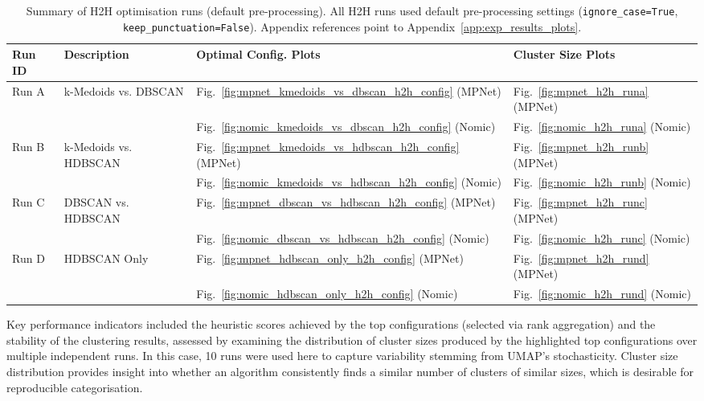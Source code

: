 \documentclass[10pt,oneside]{report}
\begin{document}
\begin{table}[H] 
    \centering
    \begin{adjustbox}{max width=\textwidth}
    \begin{tabular}{l l l l}
        \toprule
        \textbf{Run ID} & \textbf{Description} & \textbf{Optimal Config. Plots} & \textbf{Cluster Size Plots} \\
        \midrule
        Run A & k-Medoids vs. DBSCAN & Fig.~\ref{fig:mpnet_kmedoids_vs_dbscan_h2h_config} (MPNet) & Fig.~\ref{fig:mpnet_h2h_runa} (MPNet) \\
              &                      & Fig.~\ref{fig:nomic_kmedoids_vs_dbscan_h2h_config} (Nomic) & Fig.~\ref{fig:nomic_h2h_runa} (Nomic) \\
        Run B & k-Medoids vs. HDBSCAN & Fig.~\ref{fig:mpnet_kmedoids_vs_hdbscan_h2h_config} (MPNet) & Fig.~\ref{fig:mpnet_h2h_runb} (MPNet) \\
              &                       & Fig.~\ref{fig:nomic_kmedoids_vs_hdbscan_h2h_config} (Nomic) & Fig.~\ref{fig:nomic_h2h_runb} (Nomic) \\
        Run C & DBSCAN vs. HDBSCAN    & Fig.~\ref{fig:mpnet_dbscan_vs_hdbscan_h2h_config} (MPNet) & Fig.~\ref{fig:mpnet_h2h_runc} (MPNet) \\
              &                       & Fig.~\ref{fig:nomic_dbscan_vs_hdbscan_h2h_config} (Nomic) & Fig.~\ref{fig:nomic_h2h_runc} (Nomic) \\
        Run D & HDBSCAN Only          & Fig.~\ref{fig:mpnet_hdbscan_only_h2h_config} (MPNet) & Fig.~\ref{fig:mpnet_h2h_rund} (MPNet) \\
              &                       & Fig.~\ref{fig:nomic_hdbscan_only_h2h_config} (Nomic) & Fig.~\ref{fig:nomic_h2h_rund} (Nomic) \\
        \bottomrule
    \end{tabular}
    \end{adjustbox}
    \vspace{0.5em} %
    \caption{Summary of H2H optimisation runs (default pre-processing).
    All H2H runs used default pre-processing settings (\texttt{ignore\_case=True}, \texttt{keep\_punctuation=False}). Appendix references point to Appendix~\ref{app:exp_results_plots}.}
    \label{tab:h2h_summary}
\end{table}


\noindent Key performance indicators included the heuristic scores achieved by the top configurations (selected via rank aggregation) and the stability of the clustering results, assessed by examining the distribution of cluster sizes produced by the highlighted top configurations over multiple independent runs. In this case, 10 runs were used here to capture variability stemming from UMAP's stochasticity. Cluster size distribution provides insight into whether an algorithm consistently finds a similar number of clusters of similar sizes, which is desirable for reproducible categorisation. 
\end{document}
